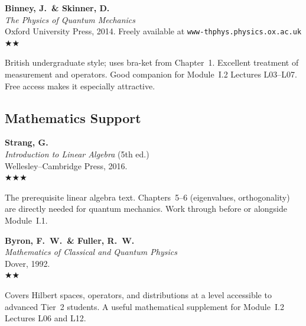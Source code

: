 \documentclass[11pt,a4paper]{article}
\newcommand{\essential}{$\bigstar\bigstar\bigstar$}
\newcommand{\recommended}{$\bigstar\bigstar$}
\newenvironment{bibentry}[1]{%
  \begin{tcolorbox}[entrybox=#1, top=4pt, bottom=4pt]%
}{%
  \end{tcolorbox}\smallskip%
}
\begin{document}
\begin{bibentry}{t2light}
\textbf{Binney, J.\ \& Skinner, D.}\\
\textit{The Physics of Quantum Mechanics}\\
Oxford University Press, 2014. Freely available at \texttt{www-thphys.physics.ox.ac.uk}\\[4pt]
\recommended\\[4pt]
\begin{tcolorbox}[annotbox]
British undergraduate style; uses bra-ket from Chapter~1. Excellent treatment of
measurement and operators. Good companion for Module~I.2 Lectures L03--L07.
Free access makes it especially attractive.
\end{tcolorbox}
\end{bibentry}

\subsection{Mathematics Support}

\begin{bibentry}{t2light}
\textbf{Strang, G.}\\
\textit{Introduction to Linear Algebra} (5th ed.)\\
Wellesley--Cambridge Press, 2016.\\[4pt]
\essential\\[4pt]
\begin{tcolorbox}[annotbox]
The prerequisite linear algebra text. Chapters~5--6 (eigenvalues, orthogonality) are
directly needed for quantum mechanics. Work through before or alongside Module~I.1.
\end{tcolorbox}
\end{bibentry}

\begin{bibentry}{t2light}
\textbf{Byron, F.~W.\ \& Fuller, R.~W.}\\
\textit{Mathematics of Classical and Quantum Physics}\\
Dover, 1992.\\[4pt]
\recommended\\[4pt]
\begin{tcolorbox}[annotbox]
Covers Hilbert spaces, operators, and distributions at a level accessible to advanced
Tier~2 students. A useful mathematical supplement for Module~I.2 Lectures L06 and L12.
\end{tcolorbox}
\end{bibentry}
\end{document}
